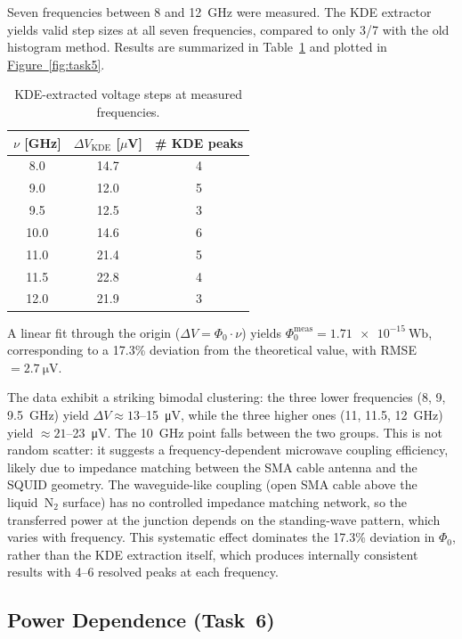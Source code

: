 \documentclass[12pt,a4paper]{article}
\begin{document}
Seven frequencies between 8 and \SI{12}{\giga\hertz} were measured. The KDE
extractor yields valid step sizes at all seven frequencies, compared to only 3/7
with the old histogram method. Results are summarized in
Table~\ref{tab:freq} and plotted in \hyperref[fig:task5]{Figure~\ref*{fig:task5}}.

\begin{table}[H]
\centering
\caption{KDE-extracted voltage steps at measured frequencies.}
\label{tab:freq}
\begin{tabular}{@{}ccc@{}}
\toprule
$\nu$ [GHz] & $\Delta V_\mathrm{KDE}$ [$\mu$V] & \# KDE peaks \\
\midrule
8.0  & 14.7 & 4 \\
9.0  & 12.0 & 5 \\
9.5  & 12.5 & 3 \\
10.0 & 14.6 & 6 \\
11.0 & 21.4 & 5 \\
11.5 & 22.8 & 4 \\
12.0 & 21.9 & 3 \\
\bottomrule
\end{tabular}
\end{table}

A linear fit through the origin ($\Delta V = \Phi_0 \cdot \nu$) yields
$\Phi_0^\mathrm{meas} = \SI{1.71e-15}{\weber}$, corresponding to a 17.3\% deviation
from the theoretical value, with RMSE~$= \SI{2.7}{\micro\volt}$.

The data exhibit a striking bimodal clustering: the three lower frequencies
(8, 9, 9.5~GHz) yield $\Delta V \approx 13$--\SI{15}{\micro\volt}, while the three
higher ones (11, 11.5, 12~GHz) yield $\approx 21$--\SI{23}{\micro\volt}. The 10~GHz
point falls between the two groups. This is not random scatter: it suggests a
frequency-dependent microwave coupling efficiency, likely due to impedance matching
between the SMA cable antenna and the SQUID geometry. The waveguide-like coupling
(open SMA cable above the liquid~N$_2$ surface) has no controlled impedance matching
network, so the transferred power at the junction depends on the standing-wave
pattern, which varies with frequency. This systematic effect dominates the 17.3\%
deviation in $\Phi_0$, rather than the KDE extraction itself, which produces
internally consistent results with 4--6 resolved peaks at each frequency.


\subsection{Power Dependence (Task~6)}
\end{document}
